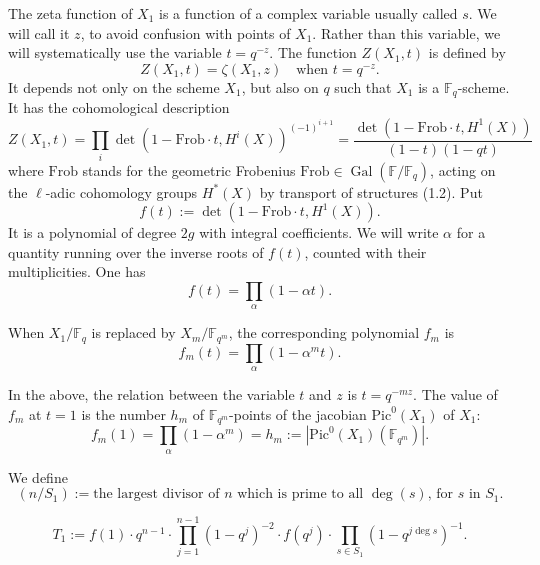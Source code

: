 \documentclass[11pt,a4paper]{article}
\theoremstyle{plain}
\theoremstyle{definition}
\DeclareMathOperator{\Gal}{Gal}
\newcommand{\Fq}{\mathbb{F}_q}
\newcommand{\F}{\mathbb{F}}
\newcommand{\Pic}{\mathrm{Pic}}
\newcommand{\Frob}{\mathrm{Frob}}
\begin{document}
The zeta function of $X_1$ is a function of a complex variable usually called $s$. We will call it $z$, to avoid confusion with points of $X_1$. Rather than this variable, we will systematically use the variable $t = q^{-z}$. The function $Z(X_1,t)$ is defined by
\begin{equation}
Z(X_1,t) = \zeta(X_1,z) \quad \text{when } t = q^{-z}.
\end{equation}
It depends not only on the scheme $X_1$, but also on $q$ such that $X_1$ is a $\Fq$-scheme. It has the cohomological description
\begin{equation}
Z(X_1,t) = \prod_i \det(1 - \Frob \cdot t, H^i(X))^{(-1)^{i+1}} = \frac{\det(1 - \Frob \cdot t, H^1(X))}{(1-t)(1-qt)}
\end{equation}
where $\Frob$ stands for the geometric Frobenius $\Frob \in \Gal(\F/\Fq)$, acting on the $\ell$-adic cohomology groups $H^*(X)$ by transport of structures (1.2). Put
\[
f(t) := \det(1 - \Frob \cdot t, H^1(X)).
\]
It is a polynomial of degree $2g$ with integral coefficients. We will write $\alpha$ for a quantity running over the inverse roots of $f(t)$, counted with their multiplicities. One has
\begin{equation}
f(t) = \prod_\alpha (1 - \alpha t).
\end{equation}

When $X_1/\Fq$ is replaced by $X_m/\F_{q^m}$, the corresponding polynomial $f_m$ is
\begin{equation}
f_m(t) = \prod_\alpha (1 - \alpha^m t).
\end{equation}

In the above, the relation between the variable $t$ and $z$ is $t = q^{-mz}$. The value of $f_m$ at $t=1$ is the number $h_m$ of $\F_{q^m}$-points of the jacobian $\Pic^0(X_1)$ of $X_1$:
\begin{equation}
f_m(1) = \prod_\alpha (1 - \alpha^m) = h_m := |\Pic^0(X_1)(\F_{q^m})|.
\end{equation}

We define
\begin{equation}
(n/S_1) := \text{the largest divisor of $n$ which is prime to all $\deg(s)$, for $s$ in $S_1$.}
\end{equation}

\begin{equation}
T_1 := f(1) \cdot q^{n-1} \cdot \prod_{j=1}^{n-1} (1-q^j)^{-2} \cdot f(q^j) \cdot \prod_{s \in S_1} (1 - q^{j\deg s})^{-1}. \tag{2.2.7}
\end{equation}
\end{document}
